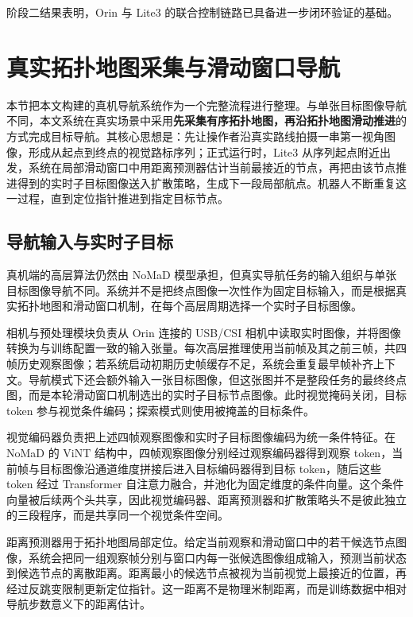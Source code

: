 阶段二结果表明，Orin 与 Lite3 的联合控制链路已具备进一步闭环验证的基础。

\section{真实拓扑地图采集与滑动窗口导航}

本节把本文构建的真机导航系统作为一个完整流程进行整理。与单张目标图像导航不同，本文系统在真实场景中采用\textbf{先采集有序拓扑地图，再沿拓扑地图滑动推进}的方式完成目标导航。其核心思想是：先让操作者沿真实路线拍摄一串第一视角图像，形成从起点到终点的视觉路标序列；正式运行时，Lite3 从序列起点附近出发，系统在局部滑动窗口中用距离预测器估计当前最接近的节点，再把由该节点推进得到的实时子目标图像送入扩散策略，生成下一段局部航点。机器人不断重复这一过程，直到定位指针推进到指定目标节点。

\subsection{导航输入与实时子目标}

真机端的高层算法仍然由 NoMaD 模型承担，但真实导航任务的输入组织与单张目标图像导航不同。系统并不是把终点图像一次性作为固定目标输入，而是根据真实拓扑地图和滑动窗口机制，在每个高层周期选择一个实时子目标图像。

相机与预处理模块负责从 Orin 连接的 USB/CSI 相机中读取实时图像，并将图像转换为与训练配置一致的输入张量。每次高层推理使用当前帧及其之前三帧，共四帧历史观察图像；若系统启动初期历史帧缓存不足，系统会重复最早帧补齐上下文。导航模式下还会额外输入一张目标图像，但这张图并不是整段任务的最终终点图，而是本轮滑动窗口机制选出的实时子目标节点图像。此时视觉掩码关闭，目标 token 参与视觉条件编码；探索模式则使用被掩盖的目标条件。

视觉编码器负责把上述四帧观察图像和实时子目标图像编码为统一条件特征。在 NoMaD 的 ViNT 结构中，四帧观察图像分别经过观察编码器得到观察 token，当前帧与目标图像沿通道维度拼接后进入目标编码器得到目标 token，随后这些 token 经过 Transformer 自注意力融合，并池化为固定维度的条件向量。这个条件向量被后续两个头共享，因此视觉编码器、距离预测器和扩散策略头不是彼此独立的三段程序，而是共享同一个视觉条件空间。

距离预测器用于拓扑地图局部定位。给定当前观察和滑动窗口中的若干候选节点图像，系统会把同一组观察帧分别与窗口内每一张候选图像组成输入，预测当前状态到候选节点的离散距离。距离最小的候选节点被视为当前视觉上最接近的位置，再经过反跳变限制更新定位指针。这一距离不是物理米制距离，而是训练数据中相对导航步数意义下的距离估计。

